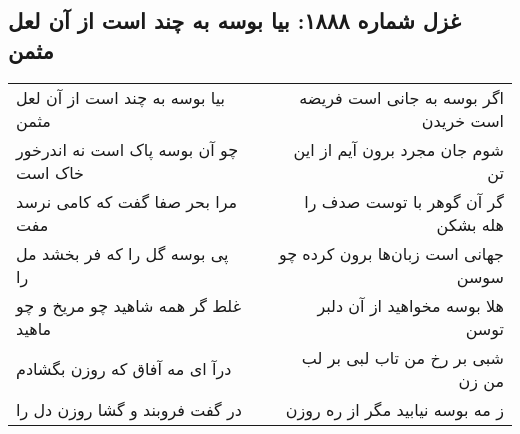 \begin{center}
\section*{غزل شماره ۱۸۸۸: بیا بوسه به چند است از آن لعل مثمن}
\label{sec:1888}
\begin{longtable}{l p{0.5cm} r}
بیا بوسه به چند است از آن لعل مثمن
&&
اگر بوسه به جانی است فریضه است خریدن
\\
چو آن بوسه پاک است نه اندرخور خاک است
&&
شوم جان مجرد برون آیم از این تن
\\
مرا بحر صفا گفت که کامی نرسد مفت
&&
گر آن گوهر با توست صدف را هله بشکن
\\
پی بوسه گل را که فر بخشد مل را
&&
جهانی است زبان‌ها برون کرده چو سوسن
\\
غلط گر همه شاهید چو مریخ و چو ماهید
&&
هلا بوسه مخواهید از آن دلبر توسن
\\
درآ ای مه آفاق که روزن بگشادم
&&
شبی بر رخ من تاب لبی بر لب من زن
\\
در گفت فروبند و گشا روزن دل را
&&
ز مه بوسه نیابید مگر از ره روزن
\\
\end{longtable}
\end{center}
